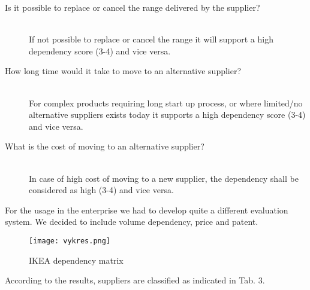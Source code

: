 \documentclass[oneside,12pt]{article}%
\begin{document}
\begin{description}
  \item[Is it possible to replace or cancel the range delivered by the supplier? ] \hfill \\
  If not possible to replace or cancel the range it will support a high dependency score (3-4) and vice versa.

  \item[How long time would it take to move to an alternative supplier? ] \hfill \\
  For complex products requiring long start up process, or where limited/no alternative suppliers exists today it supports a high dependency score (3-4) and vice versa.

  \item[What is the cost of moving to an alternative supplier?] \hfill \\
  In case of high cost of moving to a new supplier, the dependency shall be considered as high (3-4) and vice versa.

\end{description}

For the usage in the enterprise we had to develop quite a different evaluation system. We decided to include volume dependency, price and patent.


\begin{figure}[ht!]
  \texttt{[image: vykres.png]}
  \caption{IKEA dependency matrix}
\end{figure}


According to the results, suppliers are classified as indicated in Tab. 3.

\end{document}
